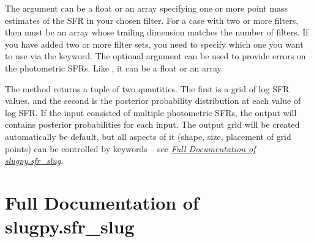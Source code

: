 \documentclass[letterpaper,10pt,english]{sphinxmanual}
\begin{document}
The argument  can be a float or an array specifying one or more point mass estimates of the SFR in your chosen filter. For a case with two or more filters, then  must be an array whose trailing dimension matches the number of filters. If you have added two or more filter sets, you need to specify which one you want to use via the  keyword. The optional argument  can be used to provide errors on the photometric SFRs. Like , it can be a float or an array.

The  method returns a tuple of two quantities. The first is a grid of log SFR values, and the second is the posterior probability distribution at each value of log SFR. If the input consisted of multiple photometric SFRs, the output will contains posterior probabilities for each input. The output grid will be created automatically be default, but all aspects of it (shape, size, placement of grid points) can be controlled by keywords -- see {\hyperref[sfr_slug:sec\string-sfr\string-slug\string-full]{\emph{Full Documentation of slugpy.sfr\_slug}}}.


\section{Full Documentation of slugpy.sfr\_slug}
\label{sfr_slug:sec-sfr-slug-full}\label{sfr_slug:full-documentation-of-slugpy-sfr-slug}
\end{document}
